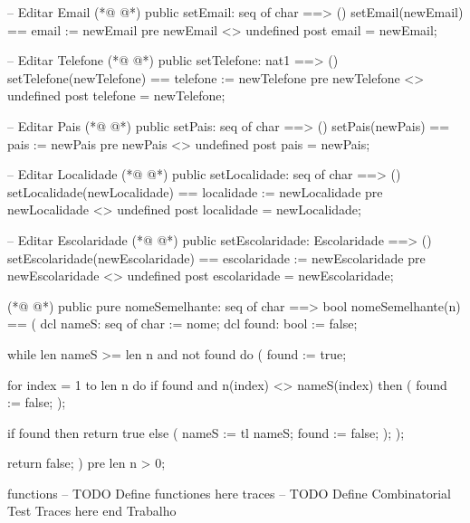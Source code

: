 \begin{vdmpp}[breaklines=true]
 -- Editar Email
(*@
\label{setEmail:169}
@*)
 public setEmail: seq of char ==> ()
 setEmail(newEmail) == email := newEmail
 pre newEmail <> undefined
 post email = newEmail;
 
 -- Editar Telefone
(*@
\label{setTelefone:175}
@*)
 public setTelefone: nat1 ==> ()
 setTelefone(newTelefone) == telefone := newTelefone
 pre newTelefone <> undefined
 post telefone = newTelefone;

 -- Editar Pais
(*@
\label{setPais:181}
@*)
 public setPais: seq of char ==> ()
 setPais(newPais) == pais := newPais
 pre newPais <> undefined
 post pais = newPais;
 
 -- Editar Localidade
(*@
\label{setLocalidade:187}
@*)
 public setLocalidade: seq of char ==> ()
 setLocalidade(newLocalidade) == localidade := newLocalidade
 pre newLocalidade <> undefined
 post localidade = newLocalidade;
 
 -- Editar Escolaridade
(*@
\label{setEscolaridade:193}
@*)
 public setEscolaridade: Escolaridade ==> ()
 setEscolaridade(newEscolaridade) == escolaridade := newEscolaridade
 pre newEscolaridade <> undefined
 post escolaridade = newEscolaridade;
 
(*@
\label{nomeSemelhante:198}
@*)
 public pure nomeSemelhante: seq of char ==> bool
 nomeSemelhante(n) == (
  dcl nameS: seq of char := nome;
  dcl found: bool := false;
  
  while len nameS >= len n and not found do (
   found := true;
 
   for index = 1 to len n do
    if found and n(index) <> nameS(index) then (
     found := false;
    );
   
   if found then
    return true
   else (
    nameS := tl nameS;
    found := false;
   );
  );
   
  return false;
 )
 pre len n > 0;
  
functions
-- TODO Define functiones here
traces
-- TODO Define Combinatorial Test Traces here
end Trabalho
\end{vdmpp}
\bigskip
